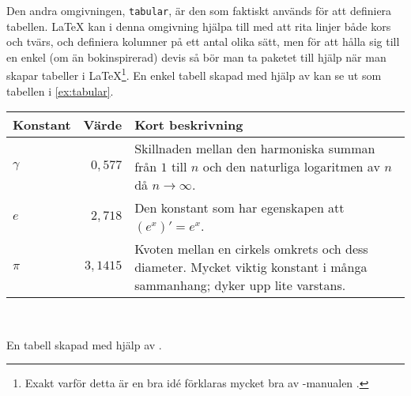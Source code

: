\documentclass[lang=sv,ptsize=10pt,font=none,nomath,titles=bf,../../a4.tex]{subfiles}
\begin{document}
Den andra omgivningen, \texttt{tabular}, är den som faktiskt används för
att definiera tabellen. \LaTeX{} kan i denna omgivning hjälpa till med att
rita linjer både kors och tvärs, och definiera kolumner på ett antal olika
sätt, men för att hålla sig till en enkel (om än bokinspirerad) devis så
bör man ta paketet  till hjälp när man skapar tabeller i
\LaTeX\footnote{Exakt varför detta är en bra idé förklaras mycket bra av
-manualen \parencite{Fear05}.}.
En enkel tabell skapad med hjälp av  kan se ut som
tabellen i \cref{ex:tabular}.

\begin{kod}[tbp]
	\centering 
	\begin{minipage}{0.9\textwidth} %
		\begin{latexcode}
\begin{tabular}{l r p{4cm}}
\toprule 
Konstant & Värde & Kort beskrivning \\
\midrule 
\(\gamma\) & \(0,577\) & Skillnaden mellan den
 harmoniska summan från \(1\) till \(n\) och den
 naturliga logaritmen av \(n\) då \(n\to\infty\).\\
\(e\) & \(2,718\) & Den konstant som har
egenskapen att \((e^x)' = e^x\). \\
\(\pi\) & \(3,1415\) & Kvoten mellan en cirkels
 omkrets och dess diameter. Mycket viktig
 konstant i många sammanhang; dyker upp
 lite varstans. \\
\bottomrule
\end{tabular}
		\end{latexcode}
	\end{minipage}
	\\ \medskip
	\caption{En tabell skapad med hjälp av .}
	\label{ex:tabular}
\end{kod}
\end{document}
